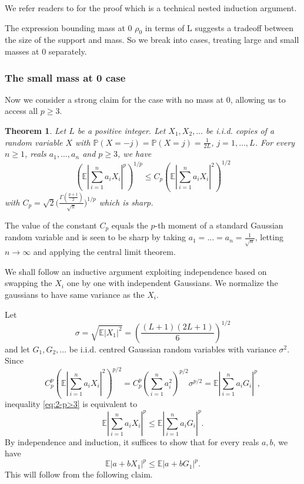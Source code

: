 \documentclass[10pt]{article}
\newcommand{\E}{\mathbb{E}}
\newcommand{\1}{\textbf{1}}
\newcommand{\p}[1]{\mathbb{P}\left( #1 \right)}
\newtheorem{theorem}{Theorem}
\theoremstyle{remark}
\theoremstyle{definition}
\begin{document}
We refer readers to \cite{HT} for the proof which is a technical nested induction argument.

The expression bounding mass at 0 $\rho_0$ in terms of L suggests a tradeoff between the size of the support and mass. So we break into cases, treating large and small masses at 0 separately. 

\subsubsection{The small mass at 0 case}

Now we consider a strong claim for the case with no mass at 0, allowing us to access all $p \geq 3$. 

\begin{theorem}\label{thm:2-p>3}
Let $L$ be a positive integer. Let $X_1,X_2,\ldots$ be i.i.d. copies of a random variable $X$ with $\p{X = -j} = \p{X = j} = \frac{1}{2L}$, $j = 1, \ldots, L$. For every $n \geq 1$, reals $a_1,\ldots,a_n$ and $p \geq 3$, we have
\begin{equation}\label{eq:2-p>3}
\left(\E\left|\sum_{i=1}^n a_iX_i \right|^p\right)^{1/p} \leq C_p \left(\E\left|\sum_{i=1}^n a_iX_i \right|^2\right)^{1/2} 
\end{equation}
with $C_p = \sqrt{2} \Big(\frac{\Gamma (\frac{p+1}{2})}{\sqrt{\pi}} \Big)^{1/p}$ which is sharp.
\end{theorem}

The value of the constant $C_p$ equals the $p$-th moment of a standard Gaussian random variable and is seen to be sharp by taking $a_1 = \ldots = a_n = \frac{1}{\sqrt{n}}$, letting $n \to \infty$ and applying the central limit theorem.

We shall follow an inductive argument exploiting independence based on swapping the $X_i$ one by one with independent Gaussians. We normalize the gaussians to have same variance as the $X_i$. 

Let 
\begin{equation}\label{eq:def-sigma}
\sigma  = \sqrt{\E |X_1|^2} = \left(\frac{(L+1)(2L+1)}{6}\right)^{1/2}
\end{equation}
and let $G_1, G_2, \ldots$ be i.i.d. centred Gaussian random variables with variance $\sigma^2$. Since
\[
C_p^p\left(\E\left|\sum_{i=1}^n a_iX_i \right|^2\right)^{p/2} = C_p^p\left(\sum_{i=1}^n a_i^2\right)^{p/2}\sigma^{p/2} = \E\left|\sum_{i=1}^n a_iG_i \right|^p,
\]
inequality \eqref{eq:2-p>3} is equivalent to
\[
 \E\left|\sum_{i=1}^n a_iX_i \right|^p \leq  \E\left|\sum_{i=1}^n a_iG_i \right|^p.
\]
By independence and induction, it suffices to show that for every reals $a, b$, we have
\begin{equation}\label{eq:XvsG}
\E|a+bX_1|^p \leq \E|a+bG_1|^p.
\end{equation}
This will follow from the following claim.
\end{document}
